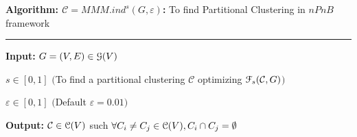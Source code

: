 \documentclass[12pt]{article}
\theoremstyle{thmstyleone}%
\theoremstyle{definition}
\begin{document}
\noindent
{\bf Algorithm: $\mathcal{C} = MMM.ind^{s}(G, \varepsilon)$:} To find Partitional Clustering in $nPnB$ framework

\vspace{-0.2cm}
\noindent
\rule{16cm}{0.025cm}

\noindent
{\bf Input:} $G = (V, E) \in \EuScript{G}(V)$

\noindent
\hspace{1.3cm}$s \in [0, 1]$ $\big($To find a partitional clustering $\mathcal{C}$ optimizing $\EuScript{F}_{s}(\mathcal{C},G)$$\big)$

\noindent
\hspace{1.3cm}$\varepsilon \in [0, 1]$ $\big($Default $\varepsilon=0.01$$\big)$

\noindent
{\bf Output:}  $\mathcal{C} \in \EuScript{C}(V)$ such $\forall C_i\neq C_j \in \EuScript{C}(V), C_i \cap C_j =\emptyset$
\end{document}
